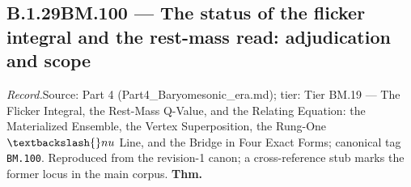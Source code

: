 \documentclass[11pt,openany]{report}
\theoremstyle{canonplain}
\theoremstyle{canondef}
\begin{document}
\medskip
\subsection*{\texorpdfstring{B.1.29\quad BM.100 — The status of the flicker integral and the rest-mass read: adjudication and scope}{BM.100 B.1.29}}
\label{tag:BM-100}
{\small \textit{Record.}\quad Source: Part 4 (Part4\_Baryomesonic\_era.md); tier: Tier BM.19 — The Flicker Integral, the Rest-Mass Q-Value, and the Relating Equation: the Materialized Ensemble, the Vertex Superposition, the Rung-One $\textbackslash{}nu$ Line, and the Bridge in Four Exact Forms; canonical tag \texttt{BM.100}. Reproduced from the revision-1 canon; a cross-reference stub marks the former locus in the main corpus.}
\medskip
\textbf{Thm.}
\end{document}
